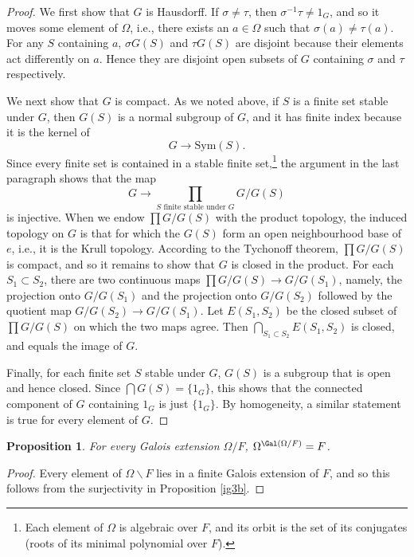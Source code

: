 \documentclass[a4paper,11pt,final,openany]{memoir}
\newtheorem{proposition}[X]{Proposition}
\theoremstyle{nonumberplain}
\newtheorem{proof}{Proof.}
\begin{document}
\begin{proof}
We first show that $G$ is Hausdorff. If $\sigma\neq\tau$, then $\sigma
^{-1}\tau\neq1_{G}$, and so it moves some element of $\Omega$, i.e., there
exists an $a\in\Omega$ such that $\sigma(a)\neq\tau(a)$. For any $S$
containing $a$, $\sigma G(S)$ and $\tau G(S)$ are disjoint because their
elements act differently on $a$. Hence they are disjoint open subsets of $G$
containing $\sigma$ and $\tau$ respectively.

We next show that $G$ is compact. As we noted above, if $S$ is a finite set
stable under $G$, then $G(S)$ is a normal subgroup of $G$, and it has finite
index because it is the kernel of%
\[
G\rightarrow\mathrm{Sym}(S).
\]
Since every finite set is contained in a stable finite set,\footnote{Each
element of $\Omega$ is algebraic over $F$, and its orbit is the set of its
conjugates (roots of its minimal polynomial over $F$).} the argument in the
last paragraph shows that the map%
\[
G\rightarrow\prod_{S\text{ finite stable under }G}G/G(S)
\]
is injective. When we endow $\prod G/G(S)$ with the product topology, the
induced topology on $G$ is that for which the $G(S)$ form an open
neighbourhood base of $e$, i.e., it is the Krull topology. According to the
Tychonoff theorem, $\prod G/G(S)$ is compact, and so it remains to show that
$G$ is closed in the product. For each $S_{1}\subset S_{2}$, there are two
continuous maps $\prod G/G(S)\rightarrow G/G(S_{1})$, namely, the projection
onto $G/G(S_{1})$ and the projection onto $G/G(S_{2})$ followed by the
quotient map $G/G(S_{2})\rightarrow G/G(S_{1})$. Let $E(S_{1},S_{2})$ be the
closed subset of $\prod G/G(S)$ on which the two maps agree. Then
$\bigcap_{S_{1}\subset S_{2}}E(S_{1},S_{2})$ is closed, and equals the image
of $G$.

Finally, for each finite set $S$ stable under $G$, $G(S)$ is a subgroup that
is open and hence closed. Since $\bigcap G(S)=\{1_{G}\}$, this shows that the
connected component of $G$ containing $1_{G}$ is just $\{1_{G}\}$. By
homogeneity, a similar statement is true for every element of $G$.
\end{proof}

\begin{proposition}
\label{ig3c}For every Galois extension $\Omega/F$, $\Omega^{\Gal(\Omega/F)}=F$.
\end{proposition}

\begin{proof}
Every element of $\Omega\smallsetminus F$ lies in a finite Galois extension of
$F$, and so this follows from the surjectivity in Proposition \ref{ig3b}.
\end{proof}
\end{document}
